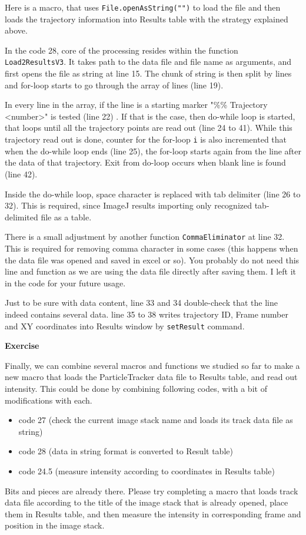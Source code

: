 \documentclass[11pt,a4paper,oneside]{report}
\newenvironment{indentexercise}[1]%
{{\setlength{\leftmargin}{2em}}%
\textbf{Exercise \thesubsection-#1}%
\begin{list}{}%
	\item%
}
{\end{list}}
\newcommand{\ilcom}[1]{\texttt{\small#1}}
\begin{document}
Here is a macro, that uses \ilcom{File.openAsString("")} to load the file and then loads the trajectory information into Results table with the strategy explained above. 



In the code 28, core of the processing resides within the function \ilcom{Load2ResultsV3}. It takes path to the data file and file name as arguments, and first opens the file as string at line 15. The chunk of string is then split by lines and for-loop starts to go through the array of lines (line 19). 

In every line in the array, if the line is a starting marker "\%\% Trajectory <number>" is tested (line 22) . If that is the case, then do-while loop is started, that loops until all the trajectory points are read out (line 24 to 41). While this trajectory read out is done, counter for the for-loop \ilcom{i} is also incremented that when the do-while loop ends (line 25), the for-loop starts again from the line after the data of that trajectory. Exit from do-loop occurs when blank line is found (line 42). 

Inside the do-while loop, space character is replaced with tab delimiter (line 26 to 32). This is required, since ImageJ results importing only recognized tab-delimited file as a table.  

There is a small adjustment by another function \ilcom{CommaEliminator} at line 32. This is required for removing comma character in some cases (this happens when the data file was opened and saved in excel or so). You probably do not need this line and function as we are using the data file directly after saving them. I left it in the code for your future usage. 

Just to be sure with data content, line 33 and 34 double-check that the line indeed contains several data. line 35 to 38 writes trajectory ID, Frame number and XY coordinates into Results window by \ilcom{setResult} command.

\begin{indentexercise}{2}
\item Finally, we can combine several macros and functions we studied so far to make a new macro that loads the ParticleTracker data file to Results table, and read out intensity. This could be done by combining following codes, with a bit of modifications with each. 
\begin{itemize}
\item code 27 (check the current image stack name and loads its track data file as string)
\item code 28 (data in string format is converted to Result table)
\item code 24.5 (measure intensity according to coordinates in Results table)
\end{itemize}
Bits and pieces are already there. Please try completing a macro that loads track data file according to the title of the image stack that is already opened, place them in Results table, and then measure the intensity in corresponding frame and position in the image stack. 
\end{indentexercise}
\end{document}

